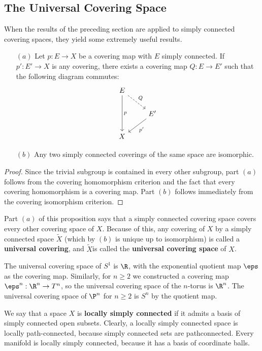 \subsection{The Universal Covering Space}
When the results of the preceding section are applied to simply connected covering
spaces, they yield some extremely useful results.
\begin{proposition}\label{universal cover prop}
\mbox{}
\begin{itemize}
\item[$(a)$] Let $p:E\to X$ be a covering map with $E$ simply connected. If $p':E'\to X$ is any covering, there exists a covering map $Q:E\to E'$ such that the following
diagram commutes:
\[\begin{tikzcd}
E\ar[dd,"p"]\ar[rd,dashed,"Q"]&\\
&E'\ar[ld,"p'"]\\
X
\end{tikzcd}\]
\item[$(b)$] Any two simply connected coverings of the same space are isomorphic.
\end{itemize}
\end{proposition}
\begin{proof}
Since the trivial subgroup is contained in every other subgroup, part $(a)$ follows
from the covering homomorphism criterion and the fact that every covering
homomorphism is a covering map. Part $(b)$ follows immediately from the covering
isomorphism criterion.
\end{proof}
Part $(a)$ of this proposition says that a simply connected covering space covers
every other covering space of $X$. Because of this, any covering of $X$ by a simply
connected space $\widetilde{X}$ (which by $(b)$ is unique up to isomorphism) is called a \textbf{universal covering}, and $\widetilde{X}$is called the \textbf{universal covering space} of $X$.
\begin{example}
The universal covering space of $S^1$ is $\R$, with the exponential quotient map $\eps$ as the covering map. Similarly, for $n\geq 2$ we constructed a covering map $\eps^n:\R^n\to T^n$, so the universal covering space of the $n$-torus is $\R^n$. The universal covering space of $\P^n$ for $n\geq2$ is $S^n$ by the quotient map.
\end{example}
We say that a space $X$ is \textbf{locally simply connected} if it admits a basis of simply connected open subsets. Clearly, a locally simply connected space is locally path-connected, because simply connected sets are pathconnected. Every manifold is locally simply connected, because it has a basis of coordinate balls.\par
